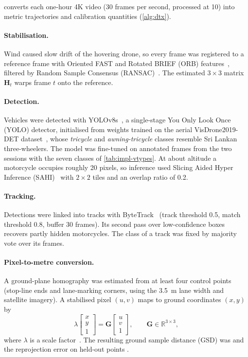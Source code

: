 \dtx{} converts each one-hour 4K video (30 frames per second, processed at 10) into metric trajectories and calibration quantities (\cref{alg:dtx}).

\paragraph{Stabilisation.} Wind caused slow drift of the hovering drone, so every frame was registered to a reference frame with Oriented FAST and Rotated BRIEF
(ORB) features~\cite{rublee2011orb}, filtered by Random Sample
Consensus (RANSAC)~\cite{fischler1981ransac}.   The estimated $3\times3$ matrix
$\mathbf{H}_t$ warps frame $t$ onto the reference.

\paragraph{Detection.} Vehicles were detected with YOLOv8s~\cite{jocher2023yolov8}, a single-stage
You Only Look Once (YOLO) detector, initialised from weights trained on the aerial VisDrone2019-DET
dataset~\cite{zhu2022visdrone}, whose \emph{tricycle} and \emph{awning-tricycle} classes resemble Sri
Lankan three-wheelers. The model was fine-tuned on  annotated frames from the two sessions
with the seven classes of \cref{tab:impl-vtypes}. At about  altitude a motorcycle occupies
roughly 20 pixels, so inference used Slicing Aided Hyper Inference (SAHI)~\cite{akyon2022sahi} with
$2\times2$ tiles and an overlap ratio of 0.2.

\paragraph{Tracking.} Detections were linked into tracks with ByteTrack~\cite{zhang2022bytetrack}
(track threshold 0.5, match threshold 0.8, buffer 30 frames).  Its second pass over low-confidence boxes recovers partly hidden motorcycles.
The class of a track was fixed by majority vote over its frames.

\paragraph{Pixel-to-metre conversion.} A ground-plane homography was estimated from at least four
control points (stop-line ends and lane-marking corners, using the 3.5~m lane width and satellite
imagery). A stabilised pixel $(u,v)$ maps to ground coordinates $(x,y)$ by
\begin{equation}
  \lambda \begin{bmatrix} x \\ y \\ 1 \end{bmatrix} = \mathbf{G}
  \begin{bmatrix} u \\ v \\ 1 \end{bmatrix}, \qquad \mathbf{G}\in\mathbb{R}^{3\times3},
  \label{eq:impl-homography}
\end{equation}
where $\lambda$ is a scale factor~\cite{hartley2004mvg}. The resulting ground sample distance (GSD)
was  and the reprojection error on held-out points .

